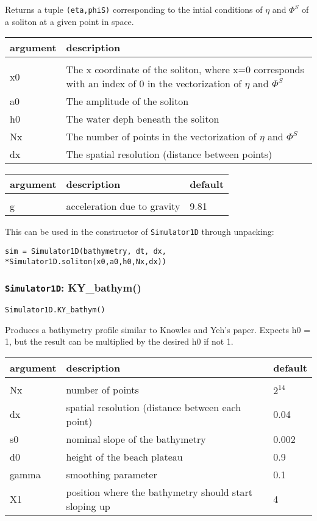 \documentclass[10pt,a4paper]{article}
\newenvironment{arglist}
    {\begin{center}
    \begin{tabular}{l|p{12cm}}
    argument & description\\
    \hline\\
    }
    { 
    \end{tabular} 
    \end{center}
    }
\newenvironment{optarglist}
    {\begin{center}
    \begin{tabular}{l|p{10cm}|l}
    argument & description & default\\
    \hline\\
    }
    { 
    \end{tabular} 
    \end{center}
    }
\begin{document}
Returns a tuple \texttt{(eta,phiS)} corresponding to the intial conditions of $\eta$ and $\Phi^S$ of a soliton at a given point in space.

\begin{arglist}
        x0   & The x coordinate of the soliton, where
                x=0 corresponds with an index of 0 in the vectorization
                of $\eta$ and $\Phi^S$\\\hline
        a0   & The amplitude of the soliton\\\hline
        h0   & The water deph beneath the soliton\\\hline
        Nx   & The number of points in the vectorization of $\eta$ and $\Phi^S$\\\hline
        dx   & The spatial resolution (distance between points)\\\hline
\end{arglist}

\begin{optarglist}
g & acceleration due to gravity & 9.81\\
\end{optarglist}

This can be used in the constructor of \texttt{Simulator1D} through unpacking:

\texttt{sim = Simulator1D(bathymetry, dt, dx, *Simulator1D.soliton(x0,a0,h0,Nx,dx))}





\subsubsection{\texttt{Simulator1D}: KY\_bathym()}
\texttt{Simulator1D.KY\_bathym()}

Produces a bathymetry profile similar to Knowles and Yeh's paper.
        Expects h0 = 1, but the result can be multiplied by the desired h0 if not 1.

\begin{optarglist}

        Nx    & number of points & $2^{14}$\\\hline
        dx    & spatial resolution (distance between each point) & 0.04\\\hline
        s0    &  nominal slope of the bathymetry & 0.002 \\\hline
        d0    & height of the beach plateau & 0.9 \\\hline
        gamma & smoothing parameter & 0.1 \\\hline
        X1    & position where the bathymetry should start sloping up & 4\\\hline
\end{optarglist}
\end{document}
